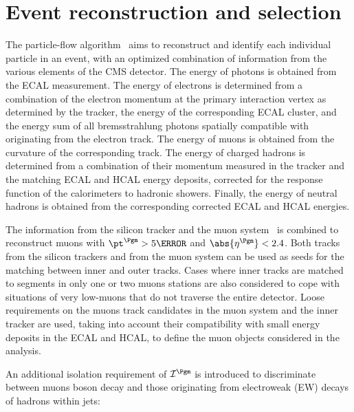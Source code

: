 \section{Event reconstruction and selection}
\label{sec:reconstruction}
The particle-flow algorithm~\cite{CMS-PRF-14-001} aims to reconstruct and identify each individual particle in an event, with an optimized combination of information from the various elements of the CMS detector. The energy of photons is obtained from the ECAL measurement. The energy of electrons is determined from a combination of the electron momentum at the primary interaction vertex as determined by the tracker, the energy of the corresponding ECAL cluster, and the energy sum of all bremsstrahlung photons spatially compatible with originating from the electron track. The energy of muons is obtained from the curvature of the corresponding track. The energy of charged hadrons is determined from a combination of their momentum measured in the tracker and the matching ECAL and HCAL energy deposits, corrected for the response function of the calorimeters to hadronic showers. Finally, the energy of neutral hadrons is obtained from the corresponding corrected ECAL and HCAL energies.


The information from the silicon tracker and the muon system~\cite{Sirunyan:2018} is combined to reconstruct muons with $\pt^{\Pgm} > 5\GeV$ and $\abs{\eta^{\Pgm}} < 2.4$. 
Both tracks from the silicon trackers and from the muon system can be used as seeds for the matching between inner and outer tracks. 
Cases where inner tracks are matched to segments in only one or two muons stations are also considered to cope with situations of very low-\pt muons that do not traverse the entire detector. 
Loose requirements on the muons track candidates in the muon system and the inner tracker are used, taking into account their compatibility with small energy deposits in the ECAL and HCAL, to define the muon objects considered in the analysis.

An additional isolation requirement of ${\mathcal I}^{\Pgm}$ is introduced to discriminate between muons \PZ boson decay and those originating from electroweak (EW) decays of hadrons within jets:

